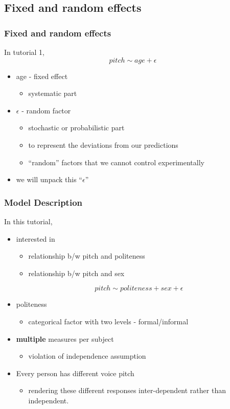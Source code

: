 \documentclass[10p]{beamer}\usepackage[]{graphicx}\usepackage[]{color}
\begin{document}
\subsection{Fixed and random effects}

\begin{frame}
\frametitle{Fixed and random effects}
In tutorial 1,
$$pitch \sim age + \epsilon$$
\begin{itemize}
\item age - fixed effect
	\begin{itemize}
	\item systematic part
	\end{itemize}

\item $\epsilon$ - random factor
	\begin{itemize}
	\item stochastic or probabilistic part
	\item to represent the deviations from our predictions
	\item ``random'' factors that we cannot control experimentally
	\end{itemize}
\item we will unpack this ``$\epsilon$''
\end{itemize}
\end{frame}

\begin{frame}
\frametitle{Model Description}
In this tutorial,
\begin{itemize}
\item interested in
	\begin{itemize}
	\item relationship b/w pitch and politeness
	\item relationship b/w pitch and sex
	\end{itemize}
\begin{displaymath}
pitch \sim politeness + sex + \epsilon
\end{displaymath}
\item politeness
	\begin{itemize}
	\item categorical factor with two levels - formal/informal
	\end{itemize}
\item \textbf{multiple} measures per subject
	\begin{itemize}
	\item violation of independence assumption
	\end{itemize}
\item Every person has different voice pitch
	\begin{itemize}
	\item rendering these different responses inter-dependent rather than independent.
	\end{itemize}
\end{itemize}
\end{frame}
\end{document}
